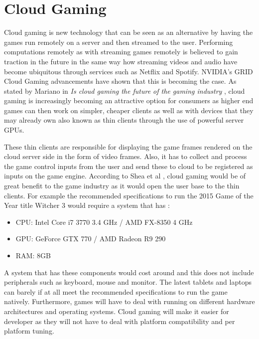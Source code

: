 \section{Cloud Gaming}
Cloud gaming is new technology that can be seen as an alternative by having the games run remotely on a server and then streamed to the user. Performing computations remotely as with streaming games remotely is believed to gain traction in the future in the same way how streaming videos and audio have become ubiquitous through services such as Netflix and Spotify. NVIDIA's GRID Cloud Gaming advancements have shown that this is becoming the case. As stated by Mariano in \textit{Is cloud gaming the future of the gaming industry} \cite{mariano2015cloud}, cloud gaming is increasingly becoming an attractive option for consumers as higher end games can then work on simpler, cheaper clients as well as with devices that they may already own also known as thin clients through the use of powerful server GPUs.
\newline
\par
These thin clients are responsible for displaying the game frames rendered on the cloud server side in the form of video frames. Also, it has to collect and process the game control inputs from the user and send these to cloud to be registered as inputs on the game engine. According to Shea et al \cite{shea2013cloud}, cloud gaming would be of great benefit to the game industry as it would open the user base to the thin clients. For example the recommended specifications to run the 2015 Game of the Year title Witcher 3\cite{goty2015} would require a system that has \cite{witcher}:
\begin{itemize}
 \item CPU: Intel Core i7 3770 3.4 GHz / AMD FX-8350 4 GHz
 \item GPU: GeForce GTX 770 / AMD Radeon R9 290
 \item RAM: 8GB
\end{itemize}
A system that has these components would cost around  and this does not include peripherals such as keyboard, mouse and monitor. The latest tablets and laptops can barely if at all meet the recommended specifications to run the game natively. Furthermore, games will have to deal with running on different hardware architectures and operating systems. Cloud gaming will make it easier for developer as they will not have to deal with platform compatibility and per platform tuning.
\newline
\par
